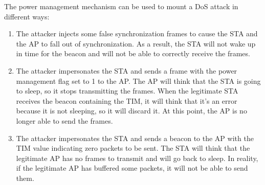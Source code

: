 \begin{solution}
    The power management mechanism can be used to mount a DoS attack in different ways:
    \begin{enumerate}
        \item The attacker injects some false synchronization frames to cause the STA and the AP to fall out of synchronization. As a result, the STA will not wake up in time for the beacon and will not be able to correctly receive the frames.
        \item The attacker impersonates the STA and sends a frame with the power management flag set to 1 to the AP. The AP will think that the STA is going to sleep, so it stops transmitting the frames. When the legitimate STA receives the beacon containing the TIM, it will think that it's an error because it is not sleeping, so it will discard it. At this point, the AP is no longer able to send the frames.
        \item The attacker impersonates the STA and sends a beacon to the AP with the TIM value indicating zero packets to be sent. The STA will think that the legitimate AP has no frames to transmit and will go back to sleep. In reality, if the legitimate AP has buffered some packets, it will not be able to send them.
    \end{enumerate}
\end{solution}

